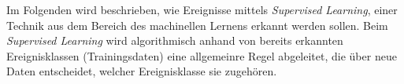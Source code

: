 Im Folgenden wird beschrieben, wie Ereignisse mittels \textit{Supervised Learning}, einer Technik aus dem Bereich des machinellen Lernens erkannt werden sollen. Beim \textit{Supervised Learning} wird algorithmisch anhand von bereits erkannten Ereignisklassen (Trainingsdaten) eine allgemeinre Regel abgeleitet, die über neue Daten entscheidet, welcher Ereignisklasse sie zugehören.